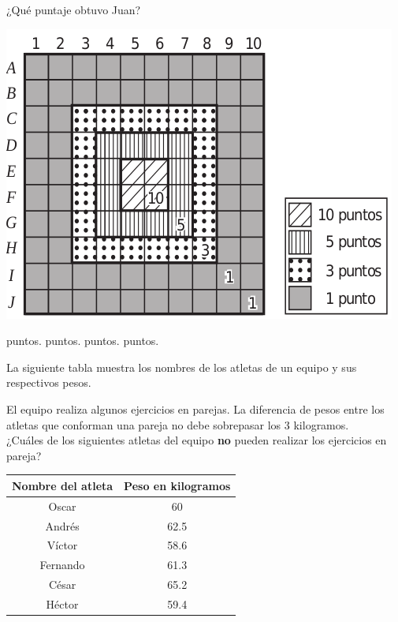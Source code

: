 \documentclass[10pt,letterpaper,addpoints]{exam}
\begin{document}
\begin{questions}
\begin{minipage}{.35\textwidth}
¿Qué puntaje obtuvo Juan?
\end{minipage}\hfill
\begin{minipage}{.65\textwidth}
\begin{center}
\includegraphics[scale=.55]{Images/juego_dados.png} 
\end{center}
\end{minipage}

\begin{oneparchoices}
 puntos.
 puntos.
 puntos.
 puntos.
\end{oneparchoices}

\begin{minipage}{.5\textwidth}
\question 
La siguiente tabla muestra los nombres de los atletas de un equipo y sus respectivos pesos.

El equipo realiza algunos ejercicios en parejas. La diferencia de pesos entre los atletas que conforman una pareja no debe sobrepasar los 3 kilogramos.\\

¿Cuáles de los siguientes atletas del equipo \textbf{no} pueden realizar los ejercicios en pareja?
\end{minipage}\hfill
\begin{minipage}{.5\textwidth}
\begin{tabular}{|c|c|}
\hline 
\textbf{Nombre del atleta} & \textbf{Peso en kilogramos} \\ 
\hline 
Oscar & 60 \\ 
\hline 
Andrés & 62.5 \\ 
\hline 
Víctor & 58.6 \\ 
\hline 
Fernando & 61.3 \\ 
\hline 
César & 65.2 \\ 
\hline 
Héctor & 59.4 \\ 
\hline 
\end{tabular} 
\end{minipage}


\end{questions}
\end{document}
